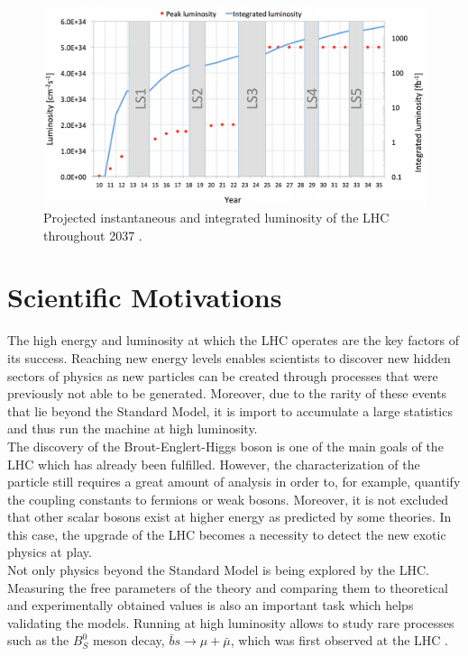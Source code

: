    \begin{figure}[t!]
      \centering
      \includegraphics[width=\textwidth]{img/I-2-LHC/lhc-schedule.png}
      \caption{Projected instantaneous and integrated luminosity of the LHC throughout 2037 \cite{HOME-CERN}.}
      \label{fig:I-2-future}
    \end{figure}

  \section{Scientific Motivations}

    The high energy and luminosity at which the LHC operates are the key factors of its success. Reaching new energy levels enables scientists to discover new hidden sectors of physics as new particles can be created through processes that were previously not able to be generated. Moreover, due to the rarity of these events that lie beyond the Standard Model, it is import to accumulate a large statistics and thus run the machine at high luminosity. \\

    The discovery of the Brout-Englert-Higgs boson is one of the main goals of the LHC which has already been fulfilled. However, the characterization of the particle still requires a great amount of analysis in order to, for example, quantify the coupling constants to fermions or weak bosons. Moreover, it is not excluded that other scalar bosons exist at higher energy as predicted by some theories. In this case, the upgrade of the LHC becomes a necessity to detect the new exotic physics at play. \\

    Not only physics beyond the Standard Model is being explored by the LHC. Measuring the free parameters of the theory and comparing them to theoretical and experimentally obtained values is also an important task which helps validating the models. Running at high luminosity allows to study rare processes such as the $ B^0_S $ meson decay, $ \bar{b}s \rightarrow \mu + \bar{\mu} $, which was first observed at the LHC \cite{b0smumu}. \\

